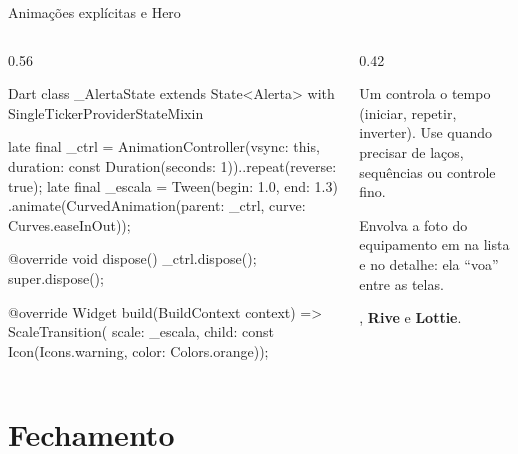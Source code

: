 \documentclass[aspectratio=169,10pt]{beamer}
\begin{document}
\begin{frame}[fragile]{Animações explícitas e Hero}
  \begin{columns}[T]
    \begin{column}{0.56\textwidth}
\begin{codigo}[title=Indicador pulsando]{Dart}
class _AlertaState extends State<Alerta>
    with SingleTickerProviderStateMixin {
  late final _ctrl = AnimationController(vsync: this,
      duration: const Duration(seconds: 1))..repeat(reverse: true);
  late final _escala = Tween(begin: 1.0, end: 1.3)
      .animate(CurvedAnimation(parent: _ctrl,
          curve: Curves.easeInOut));

  @override
  void dispose() { _ctrl.dispose(); super.dispose(); }

  @override
  Widget build(BuildContext context) => ScaleTransition(
      scale: _escala,
      child: const Icon(Icons.warning, color: Colors.orange));
}
\end{codigo}
    \end{column}
    \begin{column}{0.42\textwidth}
      \begin{conceito}[Explícita]
        Um  controla o tempo (iniciar, repetir, inverter). Use quando precisar de laços, sequências ou controle fino.
      \end{conceito}
      \begin{dica}[Hero]
        Envolva a foto do equipamento em  na lista e no detalhe: ela ``voa'' entre as telas.
      \end{dica}
      \begin{dica}[Pacotes]
        , \textbf{Rive} e \textbf{Lottie}.
      \end{dica}
    \end{column}
  \end{columns}
\end{frame}

\section{Fechamento}
\end{document}

